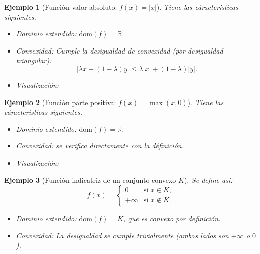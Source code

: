 \documentclass[12pt]{book}
\newtheorem{ex}{Ejemplo}
\theoremstyle{definition}
\theoremstyle{plain}
\theoremstyle{remark}
\begin{document}
\begin{ex}[Función valor absoluto: \( f(x) = |x| \)] Tiene las c\'aracteristicas siguientes.
\begin{itemize}
    \item \emph{Dominio extendido:} \( \text{dom}(f) = \mathbb{R} \).
    \item \emph{Convexidad:} Cumple la desigualdad de convexidad (por desigualdad triangular):
    \[
    |\lambda x + (1-\lambda)y| \leq \lambda |x| + (1-\lambda)|y|.
    \]
    \item \emph{Visualización:}
\end{itemize}

\begin{center}
\end{center}
\end{ex}

\begin{ex}[Función parte positiva: \( f(x) = \max(x, 0) \)] Tiene las c\'aracteristicas siguientes.
\begin{itemize}
    \item \emph{Dominio extendido:} \( \text{dom}(f) = \mathbb{R} \).
    \item \emph{Convexidad:} %
    se verifica directamente con la d\'efinici\'on.
    \item \emph{Visualización:}
\end{itemize}

\begin{center}
\end{center}
\end{ex}

\begin{ex}[Función indicatriz de un conjunto convexo \( K \)]
Se define as\'i:
    \[
    f(x) = \begin{cases}
    0 & \text{si } x \in K, \\
    +\infty & \text{si } x \notin K.
    \end{cases}
    \]
    \begin{itemize}
        \item \emph{Dominio extendido:} \( \text{dom}(f) = K \), que es convexo por definición.
        \item \emph{Convexidad:} La desigualdad se cumple trivialmente (ambos lados son \( +\infty \) o \( 0 \)).
    \end{itemize}
\end{ex}
\end{document}
